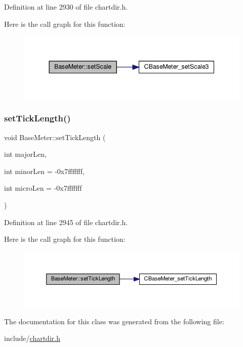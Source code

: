 Definition at line 2930 of file chartdir.\+h.

Here is the call graph for this function\+:
\nopagebreak
\begin{figure}[H]
\begin{center}
\leavevmode
\includegraphics[width=344pt]{class_base_meter_a5bb7919cb0a67c0b578620644d3dc4ae_cgraph}
\end{center}
\end{figure}
\mbox{\label{class_base_meter_afc722de87aa05068cf28bce77c5a0d96}} 
\subsubsection{\texorpdfstring{set\+Tick\+Length()}{setTickLength()}}
{\footnotesize\ttfamily void Base\+Meter\+::set\+Tick\+Length (\begin{DoxyParamCaption}\item[{int}]{major\+Len,  }\item[{int}]{minor\+Len = {\ttfamily -\/0x7fffffff},  }\item[{int}]{micro\+Len = {\ttfamily -\/0x7fffffff} }\end{DoxyParamCaption})\hspace{0.3cm}{\ttfamily [inline]}}



Definition at line 2945 of file chartdir.\+h.

Here is the call graph for this function\+:
\nopagebreak
\begin{figure}[H]
\begin{center}
\leavevmode
\includegraphics[width=350pt]{class_base_meter_afc722de87aa05068cf28bce77c5a0d96_cgraph}
\end{center}
\end{figure}


The documentation for this class was generated from the following file\+:\begin{DoxyCompactItemize}
\item 
include/\hyperlink{chartdir_8h}{chartdir.\+h}\end{DoxyCompactItemize}
